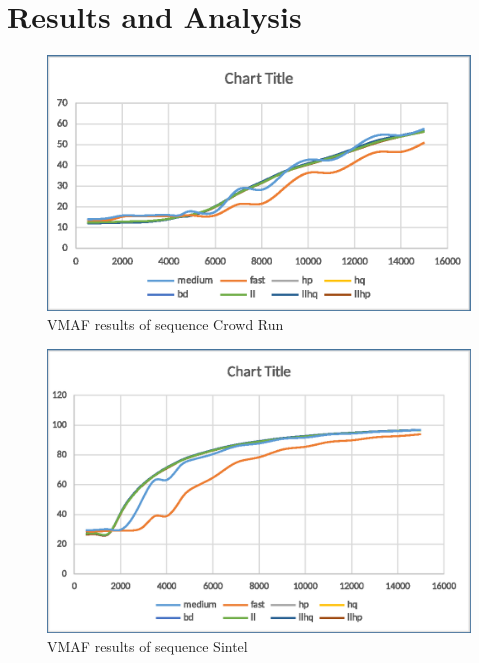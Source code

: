 \documentclass[12pt,twoside]{article}
\begin{document}
\section{Results and Analysis}
\label{sec:results}
\begin{figure}[h]
	\vspace{-10pt}
	\centering
	\includegraphics[width=\textwidth]{img/h264nvencvmafcrowd.eps}
	\caption{VMAF results of sequence Crowd Run}
	\label{fig:h264nvencvmafcrowd}
\end{figure}
\begin{figure}[!h]
	\vspace{-5pt}
	\centering
	\includegraphics[width=\textwidth]{img/h264nvencvmafsintel.eps}
	\caption{VMAF results of sequence Sintel}
	\label{fig:h264nvencvmafsintel}
\end{figure}
\end{document}
